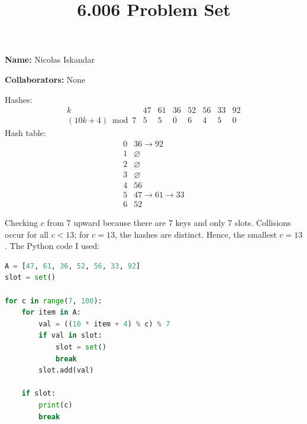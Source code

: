 \documentclass[12pt,twoside]{article}
\title{6.006 Problem Set \theproblemsetnum}
\newcommand{\theproblemsetnum}{3}
\begin{document}
\handout{Problem Set \theproblemsetnum}

\setlength{\parindent}{0pt}
\medskip\hrulefill\medskip

{\bf Name:} Nicolas Iskandar

\medskip

{\bf Collaborators:} None

\medskip\hrulefill

\begin{problems}

\problem %

\begin{problemparts}
\problempart %
Hashes:
\[
\begin{array}{c|ccccccc}
k & 47 & 61 & 36 & 52 & 56 & 33 & 92\\
\hline
(10k+4)\bmod 7 & 5 & 5 & 0 & 6 & 4 & 5 & 0
\end{array}
\]
Hash table:
\[
\begin{array}{c|l}
0 & 36 \to 92\\
1 & \varnothing\\
2 & \varnothing\\
3 & \varnothing\\
4 & 56\\
5 & 47 \to 61 \to 33\\
6 & 52
\end{array}
\]

\problempart %
Checking $c$ from 7 upward because there are 7 keys and only 7 slots. Collisions occur for all $c<13$; for $c=13$, the hashes are distinct. Hence, the smallest $c=13$.
The Python code I used:

\begin{lstlisting}[language=Python, style=pythonstyle]
A = [47, 61, 36, 52, 56, 33, 92]
slot = set()

for c in range(7, 100):
    for item in A:
        val = ((10 * item + 4) % c) % 7
        if val in slot:
            slot = set()
            break
        slot.add(val)

    if slot:
        print(c)
        break
\end{lstlisting}
\end{problemparts}

\newpage


\end{problems}
\end{document}
